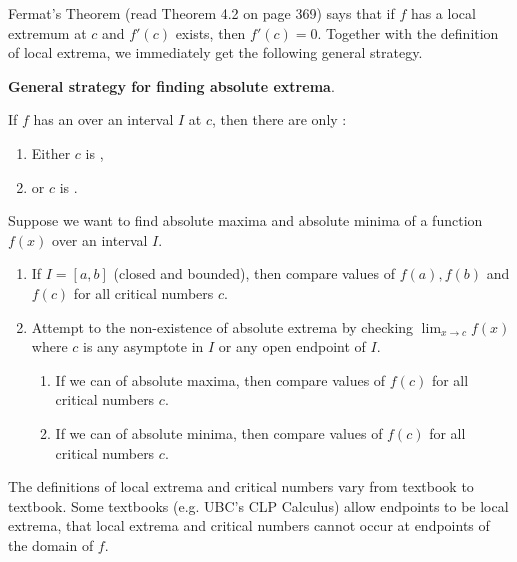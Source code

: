 \documentclass[../main.tex]{subfiles}
\begin{document}
  Fermat's Theorem (read Theorem 4.2 on page 369) says that if \(f\) has a local extremum at \(c\) and \(f'(c)\) exists, then \(f'(c) = 0\). Together with the definition of local extrema, we immediately get the following general strategy.

  \begin{mdframed}[style=simple-compact]
    \textbf{General strategy for finding absolute extrema}. 

    If \(f\) has an  over an interval \(I\) at \(c\), then there are only :
    \begin{enumerate}
      \item Either \(c\) is \underline{\hspace{4in}},
      \item or \(c\) is \underline{\hspace{4in}}.
    \end{enumerate}
  \end{mdframed}

  Suppose we want to find absolute maxima and absolute minima of a function \(f(x)\) over an interval \(I\).
  \begin{enumerate}
    \item If \(I = [a,b]\) (closed and bounded), then compare values of \(f(a), f(b)\) and \(f(c)\) for all critical numbers \(c\).

    \item Attempt to  the non-existence of absolute extrema by checking \(\lim_{x \to c}f(x)\) where \(c\) is any asymptote in \(I\) or any open endpoint of \(I\).
      \begin{enumerate}
        \item If we can  of absolute maxima, then compare values of \(f(c)\) for all critical numbers \(c\).
        \item If we can  of absolute minima, then compare values of \(f(c)\) for all critical numbers \(c\).
      \end{enumerate}
  \end{enumerate}
  \bigskip{}

  \faExclamationTriangle{} The definitions of local extrema and critical numbers vary from textbook to textbook. Some textbooks (e.g. UBC's CLP Calculus) allow endpoints to be local extrema,  that local extrema and critical numbers cannot occur at endpoints of the domain of \(f\).
\end{document}
